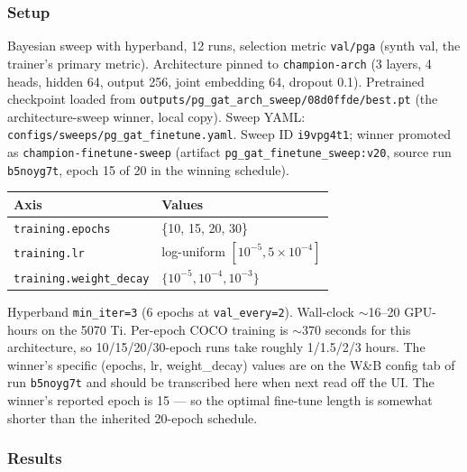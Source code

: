 \subsubsection{Setup}

Bayesian sweep with hyperband, 12 runs, selection metric \texttt{val/pga} (synth val, the trainer's primary metric).
Architecture pinned to \texttt{champion-arch} (3 layers, 4 heads, hidden 64, output 256, joint embedding 64, dropout 0.1).
Pretrained checkpoint loaded from \texttt{outputs/pg\_gat\_arch\_sweep/08d0ffde/best.pt} (the architecture-sweep winner, local copy).
Sweep YAML: \texttt{configs/sweeps/pg\_gat\_finetune.yaml}.
Sweep ID \texttt{i9vpg4t1}; winner promoted as \texttt{champion-finetune-sweep} (artifact \texttt{pg\_gat\_finetune\_sweep:v20}, source run \texttt{b5noyg7t}, epoch 15 of 20 in the winning schedule).

\begin{tabular}{ll}
\hline
\textbf{Axis} & \textbf{Values} \\
\hline
\texttt{training.epochs}        & \{10, 15, 20, 30\} \\
\texttt{training.lr}            & log-uniform $[10^{-5}, 5\!\times\!10^{-4}]$ \\
\texttt{training.weight\_decay} & $\{10^{-5}, 10^{-4}, 10^{-3}\}$ \\
\hline
\end{tabular}

\vspace{0.5em}

Hyperband \texttt{min\_iter=3} (6 epochs at \texttt{val\_every=2}). Wall-clock $\sim$16--20 GPU-hours on the 5070 Ti. Per-epoch COCO training is $\sim$370 seconds for this architecture, so 10/15/20/30-epoch runs take roughly 1/1.5/2/3 hours.
The winner's specific (epochs, lr, weight\_decay) values are on the W\&B config tab of run \texttt{b5noyg7t} and should be transcribed here when next read off the UI.
The winner's reported epoch is 15 --- so the optimal fine-tune length is somewhat shorter than the inherited 20-epoch schedule.

\subsubsection{Results}

